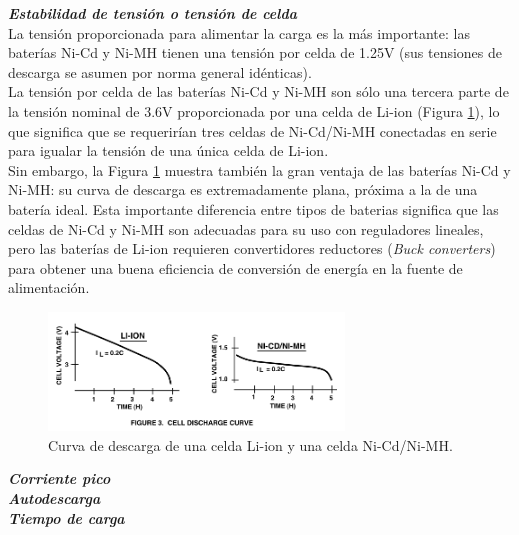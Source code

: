 \documentclass[12pt]{article}
\begin{document}
	\noindent \textit{\textbf{Estabilidad de tensión o tensión de celda}}\\
	
	\noindent La tensión proporcionada para alimentar la carga es la más importante: las baterías Ni-Cd y Ni-MH tienen una tensión por celda de 1.25V (sus tensiones de descarga se asumen por norma general idénticas). \\
	\noindent La tensión por celda de las baterías Ni-Cd y Ni-MH son sólo una tercera parte de la tensión nominal de 3.6V proporcionada por una celda de Li-ion (Figura \ref{fig: curva descarga celdas}), lo que significa que se requerirían tres celdas de Ni-Cd/Ni-MH conectadas en serie para igualar la tensión de una única celda de Li-ion.\\
	\noindent Sin embargo, la Figura \ref{fig: curva descarga celdas} muestra también la gran ventaja de las baterías Ni-Cd y Ni-MH: su curva de descarga es extremadamente plana, próxima a la de una batería ideal. Esta importante diferencia entre tipos de baterias significa que las celdas de Ni-Cd y Ni-MH son adecuadas para su uso con reguladores lineales, pero las baterías de Li-ion requieren convertidores reductores (\textit{Buck converters}) para obtener una buena eficiencia de conversión de energía en la fuente de alimentación. \\
		
	\begin{figure}[h]
		\begin{center}
			\includegraphics[width=0.7\textwidth]{img/cellDischargeCurve_TxInst.png}
			\caption{Curva de descarga de una celda Li-ion y una celda Ni-Cd/Ni-MH.}
			\label{fig: curva descarga celdas}
		\end{center}
	\end{figure}
	
	\pagebreak 
	
	\noindent \textit{\textbf{Corriente pico}}\\	
	
	\noindent \textit{\textbf{Autodescarga}}\\	
	
	\noindent \textit{\textbf{Tiempo de carga}}\\	
	
\end{document}
